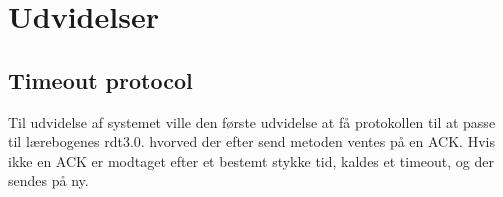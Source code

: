 \chapter{Udvidelser}

\section{Timeout protocol}
Til udvidelse af systemet ville den første udvidelse at få protokollen til at passe til lærebogenes rdt3.0. hvorved der efter send metoden ventes på en ACK. Hvis ikke en ACK er modtaget efter et bestemt stykke tid, kaldes et timeout, og der sendes på ny. 

